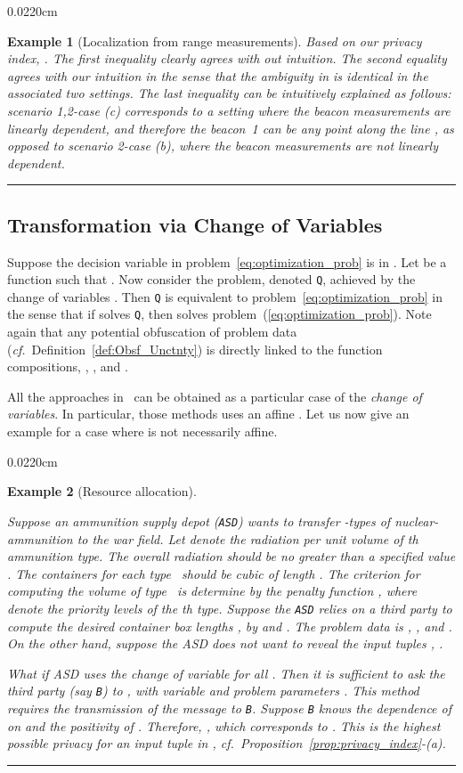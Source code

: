 \documentclass[12pt,draftcls,onecolumn]{IEEEtran}
\newtheorem{example}{Example}
\newcommand{\cf}{{\textit{cf.}}}
\newenvironment{Exx}
{\begin{adjustwidth}{0.022\linewidth}{0cm}
\begingroup\small
\vspace{-1.0em}
\raisebox{-.25em}{\rule{\linewidth}{0.3pt}}
\begin{example}
}
{
\end{example}
\vspace{-6mm}
\rule{\linewidth}{0.3pt}
\endgroup
\end{adjustwidth}}
\newcommand{\addnew}[1]{{{\color{blue!0!black}#1}}}
\begin{document}
\begin{Exx}[\addnew{Localization from range measurements}]
{Based on our privacy index, . The first inequality clearly agrees with out intuition. The second equality agrees with our intuition in the sense that the ambiguity in  is identical in the associated two settings. The last inequality can be intuitively explained as follows: scenario 1,2-case (c) corresponds to a setting where the beacon measurements are linearly dependent, and therefore the beacon~1 can be any point along the line , as opposed to scenario 2-case (b), where the beacon measurements are not linearly dependent.}
\end{Exx}


\subsection{Transformation via Change of Variables}\label{subsec:chg_of_variable}

\addnew
{
Suppose the decision variable  in problem~\eqref{eq:optimization_prob} is in . Let  be a function  such that . Now consider the problem, denoted \texttt{Q}, achieved by the change of variables . Then \texttt{Q} is equivalent to problem~\eqref{eq:optimization_prob} in the sense that if  solves \texttt{Q}, then  solves problem~(\ref{eq:optimization_prob}). Note again that any potential obfuscation of problem data (\cf~Definition~\ref{def:Obsf_Unctnty}) is directly linked to the function compositions, , , and .
}

\addnew
{
All the approaches in~\cite{Mangasarian-OptLet-2011,Dreier-Kerschbaum-2011,Mangasarian-OptMethSW-2011,Bednarz-Bean-Roughan-2009,Wang-Ren-Wang-11,Bednarz-2012,Mangasarian-Wild-2008,Mangasarian-Wild-Fung-2008} can be obtained as a particular case of the \emph{change of variables}. In particular, those methods uses an affine . Let us now give an example for a case where  is not necessarily affine.}
\begin{Exx}[\addnew{Resource allocation}]\label{ex:nonlinear_change_variables}
\addnew
{
Suppose an ammunition supply depot (\texttt{ASD}) wants to transfer -types of nuclear-ammunition to the war field. Let  denote the radiation per unit volume of th ammunition type. The overall radiation should be no greater than a specified value . The containers for each type~ should be cubic of length . The criterion for computing the volume of type~ is determine by the penalty function , where  denote the priority levels of the th type. Suppose the \texttt{ASD} relies on a third party to compute the desired container box lengths , by   and . The problem data is , , and . On the other hand, suppose the ASD does not want to reveal the input tuples , .

What if ASD uses the change of variable  for all . Then it is sufficient to ask the third party (say \texttt{B}) to  ,
with variable  and problem parameters .
This method requires the transmission of the message  to \texttt{B}. Suppose \texttt{B} knows the dependence of  on  and the positivity of . Therefore, , which corresponds to . This is the highest possible privacy for an input tuple in , \cf~Proposition~\ref{prop:privacy_index}-(a).}
\end{Exx}
\end{document}
